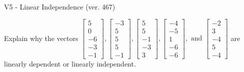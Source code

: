 \begin{exercise}
  \begin{exerciseTitle}V5 - Linear Independence (ver. 467)\end{exerciseTitle}
  \begin{exerciseStatement}
    Explain why the vectors \(\left[\begin{array}{r}
5 \\
0 \\
-6 \\
-3 \\
-1
\end{array}\right] , \left[\begin{array}{r}
-3 \\
5 \\
5 \\
5 \\
-1
\end{array}\right] , \left[\begin{array}{r}
5 \\
5 \\
-1 \\
-3 \\
3
\end{array}\right] , \left[\begin{array}{r}
-4 \\
-5 \\
1 \\
-6 \\
-6
\end{array}\right] , \text{ and } \left[\begin{array}{r}
-2 \\
3 \\
-4 \\
5 \\
-4
\end{array}\right]\) are linearly dependent or linearly independent.	



\end{exerciseStatement}
\end{exercise}
